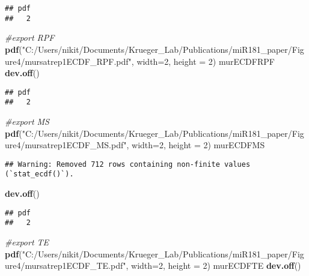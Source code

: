 \documentclass[
]{article}
\newenvironment{Shaded}{\begin{snugshade}}{\end{snugshade}}
\newcommand{\AttributeTok}[1]{\textcolor[rgb]{0.13,0.29,0.53}{#1}}
\newcommand{\CommentTok}[1]{\textcolor[rgb]{0.56,0.35,0.01}{\textit{#1}}}
\newcommand{\DecValTok}[1]{\textcolor[rgb]{0.00,0.00,0.81}{#1}}
\newcommand{\FunctionTok}[1]{\textcolor[rgb]{0.13,0.29,0.53}{\textbf{#1}}}
\newcommand{\NormalTok}[1]{#1}
\newcommand{\StringTok}[1]{\textcolor[rgb]{0.31,0.60,0.02}{#1}}
\begin{document}
\begin{verbatim}
## pdf 
##   2
\end{verbatim}

\begin{Shaded}
\begin{Highlighting}[]
\CommentTok{\#export RPF}
\FunctionTok{pdf}\NormalTok{(}\StringTok{"C:/Users/nikit/Documents/Krueger\_Lab/Publications/miR181\_paper/Figure4/mursatrep1ECDF\_RPF.pdf"}\NormalTok{, }\AttributeTok{width=}\DecValTok{2}\NormalTok{, }\AttributeTok{height =} \DecValTok{2}\NormalTok{)}
\NormalTok{murECDFRPF}
\FunctionTok{dev.off}\NormalTok{()}
\end{Highlighting}
\end{Shaded}

\begin{verbatim}
## pdf 
##   2
\end{verbatim}

\begin{Shaded}
\begin{Highlighting}[]
\CommentTok{\#export MS}
\FunctionTok{pdf}\NormalTok{(}\StringTok{"C:/Users/nikit/Documents/Krueger\_Lab/Publications/miR181\_paper/Figure4/mursatrep1ECDF\_MS.pdf"}\NormalTok{, }\AttributeTok{width=}\DecValTok{2}\NormalTok{, }\AttributeTok{height =} \DecValTok{2}\NormalTok{)}
\NormalTok{murECDFMS}
\end{Highlighting}
\end{Shaded}

\begin{verbatim}
## Warning: Removed 712 rows containing non-finite values (`stat_ecdf()`).
\end{verbatim}

\begin{Shaded}
\begin{Highlighting}[]
\FunctionTok{dev.off}\NormalTok{()}
\end{Highlighting}
\end{Shaded}

\begin{verbatim}
## pdf 
##   2
\end{verbatim}

\begin{Shaded}
\begin{Highlighting}[]
\CommentTok{\#export TE}
\FunctionTok{pdf}\NormalTok{(}\StringTok{"C:/Users/nikit/Documents/Krueger\_Lab/Publications/miR181\_paper/Figure4/mursatrep1ECDF\_TE.pdf"}\NormalTok{, }\AttributeTok{width=}\DecValTok{2}\NormalTok{, }\AttributeTok{height =} \DecValTok{2}\NormalTok{)}
\NormalTok{murECDFTE}
\FunctionTok{dev.off}\NormalTok{()}
\end{Highlighting}
\end{Shaded}
\end{document}
